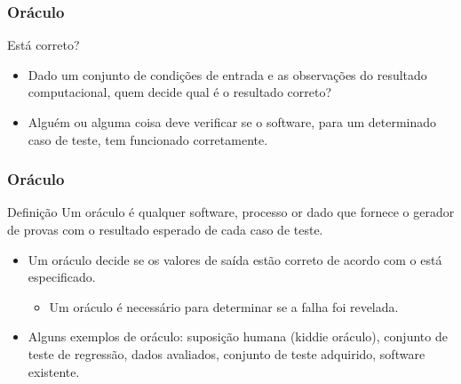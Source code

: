 \begin{frame}[parent={cmap:software-testing-foundations}, hasprev=false, hasnext=true]
\frametitle{Oráculo}

\begin{block:fact}{Está correto?}
\begin{itemize}
	\item Dado um conjunto de condições de entrada e as observações do resultado computacional, quem decide qual é o resultado correto?

	\item Alguém ou alguma coisa deve verificar se o software, para um determinado caso de teste, tem funcionado corretamente.
\end{itemize}
\end{block:fact}
\end{frame}


\begin{frame}[hasprev=true, hasnext=true]
\frametitle{Oráculo}
\label{concept:oráculo}

\begin{block:concept}{Definição}
Um oráculo é qualquer software, processo or dado que fornece o gerador de provas com o resultado esperado de cada caso de teste.
\end{block:concept}

\begin{block:fact}{}
\begin{itemize}
	\item Um oráculo decide se os valores de saída estão correto de acordo com o está especificado.
	\begin{itemize}
		\item Um oráculo é necessário para determinar se a falha foi revelada.
	\end{itemize}

	\item Alguns exemplos de oráculo: suposição humana (kiddie oráculo), conjunto de teste de regressão, dados avaliados, conjunto de teste adquirido, software existente.
\end{itemize}
\end{block:fact}
\end{frame}




